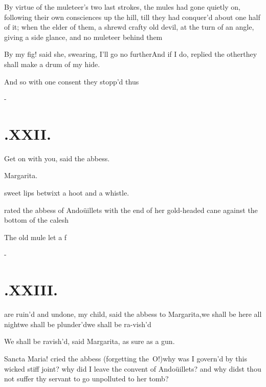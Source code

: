 \documentclass{article}
\begin{document}
By virtue of the muleteer’s two last strokes, the mules had
gone quietly on, following their own consciences up the hill, till
they had conquer’d about one half of it; when the elder of
them, a shrewd crafty old devil, at the turn of an angle, giving a
side glance, and no muleteer behind them\tsh

By my fig! said she, swearing, I’ll go\break
no further\tsh And if I do, replied the\break
other\tsk they shall make a drum of my\break
hide.\tsh

And so with one consent they stopp’d thus\tsh

\vfill{}\eject
\null\kern-\baselineskip
\section{.\enspace XXII.}

\quad\tsh Get on with you, said the abbess.

\noindent
{}\break
Margarita.

\noindent
{}

\noindent
{}\break
{}
sweet lips betwixt a hoot and a whistle.

\noindent
{}\break
rated the abbess of Andoüillets with the end of her gold-headed
cane against the bottom of the calesh\tsh

\tsh The old mule let a f\tsk

\vfill{}\eject
\null\kern-\baselineskip
\section{.\enspace XXIII.}

 are ruin’d and undone, my\break
child, said the abbess to Margarita,\tsh we shall
be here all night\tsh we shall be
plunder’d\tsh we shall be ra-\break vish’d\tsh

\tsh We shall be ravish’d, said Margarita,
as sure as a gun.

Sancta Maria! cried the abbess (forgetting the~O!)\tsk why was I govern’d by this
wicked stiff joint? why did I leave the convent of
Andoüillets? and why didst thou not suffer thy servant
to go unpolluted to her tomb?
\end{document}
